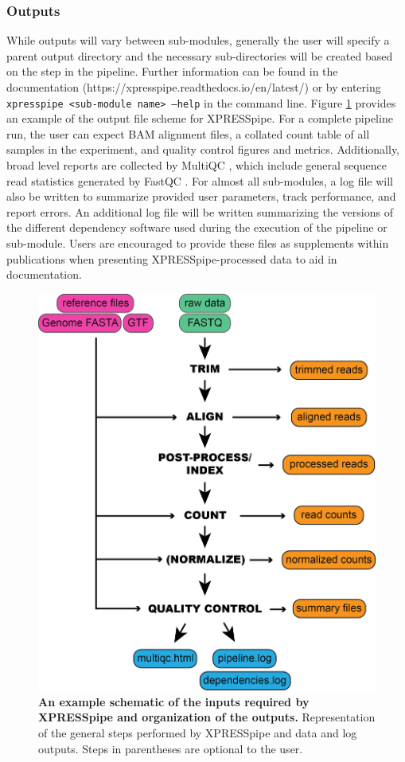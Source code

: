 \documentclass[10pt, oneside]{article}
\begin{document}
\subsubsection{Outputs}
While outputs will vary between sub-modules, generally the user will specify a parent output directory and the necessary sub-directories will be created based on the step in the pipeline. Further information can be found in the documentation (https://xpresspipe.readthedocs.io/en/latest/) or by entering \texttt{xpresspipe \textless sub-module name\textgreater \ --help} in the command line. Figure \ref{fig:outputs} provides an example of the output file scheme for XPRESSpipe. For a complete pipeline run, the user can expect BAM alignment files, a collated count table of all samples in the experiment, and quality control figures and metrics. Additionally, broad level reports are collected by MultiQC \cite{multiqc}, which include general sequence read statistics generated by FastQC \cite{fastqc}. For almost all sub-modules, a log file will also be written to summarize provided user parameters, track performance, and report errors. An additional log file will be written summarizing the versions of the different dependency software used during the execution of the pipeline or sub-module. Users are encouraged to provide these files as supplements within publications when presenting XPRESSpipe-processed data to aid in documentation.

\begin{figure}
\centering
  \includegraphics[width=120mm]{figures/xpresspipe_figure1.png}
  \caption{\textbf{An example schematic of the inputs required by XPRESSpipe and organization of the outputs.} Representation of the general steps performed by XPRESSpipe and data and log outputs. Steps in parentheses are optional to the user.}
  \label{fig:outputs}
\end{figure}
\end{document}
